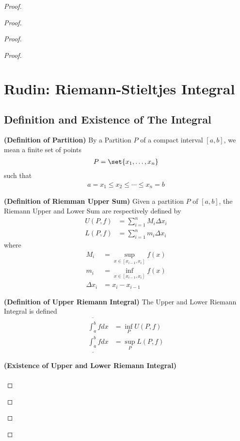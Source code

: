 \documentclass{report}
\begin{document}
\begin{proof}
\begin{proof}
\begin{proof}
\begin{proof}
\chapter{Rudin: Riemann-Stieltjes Integral}
\section{Definition and Existence of The Integral}
\begin{definition}
\label{7.1.1}
\textbf{(Definition of Partition)} By a Partition $P$ of a compact interval  $[a,b]$, we mean a finite set of points 
\begin{align*}
P=\set{x_1,\dots ,x_n}
\end{align*}
such that 
\begin{align*}
a=x_1\leq x_2 \leq  \cdots \leq x_n=b
\end{align*}
\end{definition}
\begin{definition}
\label{7.1.2}
\textbf{(Definition of Riemman Upper Sum)} Given a partition $P$ of $[a,b]$, the Riemann Upper and Lower Sum are respectively defined by 
\begin{align*}
U(P,f)&=\sum_{i=1}^n M_i \Delta x_i\\
L(P,f)&=\sum_{i=1}^n m_i \Delta x_i
\end{align*}
where 
\begin{align*}
M_i&=\sup_{x\in [x_{i-1},x_i]}f(x)\\
m_i&=\inf_{x\in [x_{i-1},x_i]}f(x)\\
\Delta x_i&=x_i-x_{i-1}
\end{align*}
\end{definition}
\begin{definition}
\label{7.1.3}
\textbf{(Definition of Upper Riemann Integral)} The Upper and Lower Riemann Integral is defined 
\begin{align*}
\overline{\int_a^b} fdx&=\inf_P U(P,f)\\
\underline{\int_a^b}fdx&=\sup_P L(P,f)
\end{align*}
\end{definition}
\begin{theorem}
\label{7.1.4}
\textbf{(Existence of Upper and Lower Riemann Integral)} 
\begin{align*}

\end{align*}
\end{theorem}
\end{proof}
\end{proof}
\end{proof}
\end{proof}
\end{document}
